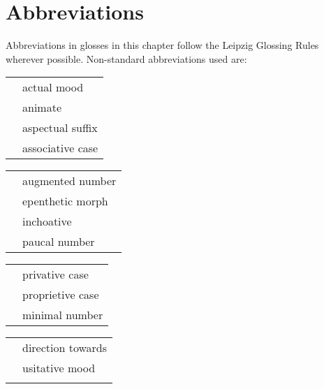 \documentclass[output=paper,hidelinks]{langscibook}
\begin{document}
\section*{Abbreviations}

Abbreviations in glosses in this chapter follow the Leipzig Glossing Rules wherever possible. Non-standard abbreviations used are:\medskip

\noindent\begin{tabularx}{.45\textwidth}{lQ}
 & actual mood\\
 & animate\\
 & aspectual suffix\\
 & associative case\\
\end{tabularx}
\begin{tabularx}{.45\textwidth}{lQ}
 & augmented number\\
 &  epenthetic morph\\
 & inchoative\\
 &  paucal number\\
\end{tabularx}

\begin{tabularx}{.45\textwidth}{lQ}
 & privative case\\
 & proprietive case\\
 & minimal number\\
\end{tabularx}
\begin{tabularx}{.45\textwidth}{lQ}
 & direction towards\\
 & usitative mood\\
\\
\end{tabularx}

\sloppy
\printbibliography[heading=subbibliography,notkeyword=this]
\end{document}

